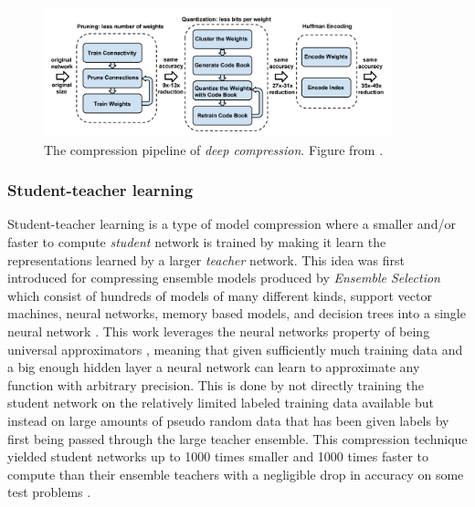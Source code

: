 \documentclass{kththesis}
\newcommand{\bibentry}[1]{\parencite{#1}}
\begin{document}
\begin{figure}[h]
  \centering
  \includegraphics[width=0.9\textwidth]{DeepCompression}
  \caption{The compression pipeline of \textit{deep compression}. Figure from \textcite[]{han2015deep}.}
  \label{fig:DeepCompression}
  \end{figure}

\subsubsection{Student-teacher learning}
Student-teacher learning is a type of model compression where a smaller and/or
faster to compute \emph{student} network is trained by making it learn the
representations learned by a larger \emph{teacher} network. This idea was first
introduced for compressing ensemble models produced by \emph{Ensemble Selection}
\bibentry{caruana2004ensemble} which consist of hundreds of models of many
different kinds, support vector machines, neural networks, memory based models,
and decision trees into a single neural network \bibentry{bucilua2006model}.
This work leverages the neural networks property of being universal
approximators \bibentry{cybenko1989approximation}, meaning that given
sufficiently much training data and a big enough hidden layer a neural network
can learn to approximate any function with arbitrary precision. This is done by not directly
training the student network on the relatively limited labeled training data
available but instead on large amounts of pseudo random data that has been given
labels by first being passed through the large teacher ensemble. This
compression technique yielded student networks up to 1000 times smaller and 1000
times faster to compute than their ensemble teachers with a negligible drop in accuracy
on some test problems \parencite{bucilua2006model}. 
\end{document}
